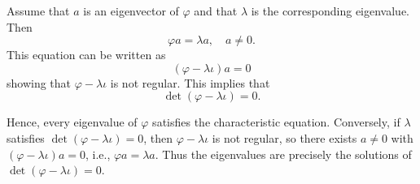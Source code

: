 Assume that $a$ is an eigenvector of $\varphi$ and that $\lambda$ is the corresponding eigenvalue. Then
$$\varphi a = \lambda a, \quad a \neq 0.$$
This equation can be written as
$$(\varphi - \lambda \iota) a = 0$$
showing that $\varphi - \lambda \iota$ is not regular. This implies that
$$\det (\varphi - \lambda \iota) = 0.$$

Hence, every eigenvalue of $\varphi$ satisfies the characteristic equation. Conversely, if $\lambda$ satisfies $\det(\varphi - \lambda \iota) = 0$, then $\varphi - \lambda \iota$ is not regular, so there exists $a \neq 0$ with $(\varphi - \lambda \iota)a = 0$, i.e., $\varphi a = \lambda a$. Thus the eigenvalues are precisely the solutions of $\det(\varphi - \lambda \iota) = 0$.
